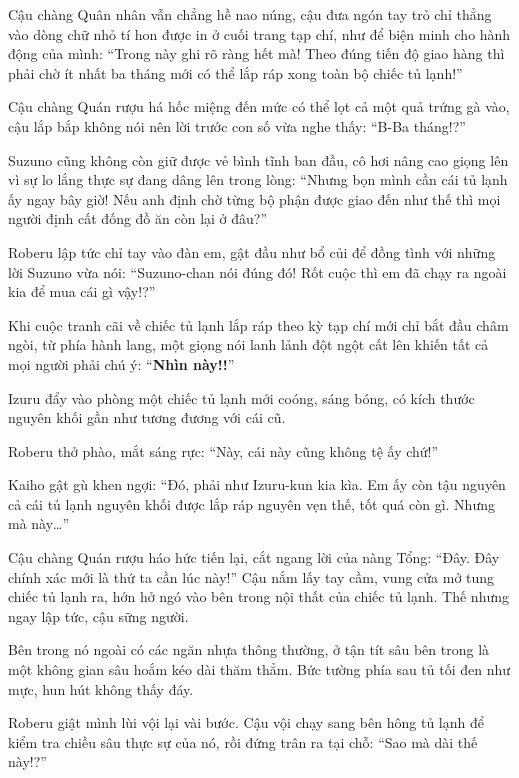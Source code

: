 \documentclass[../main.tex]{subfiles}
\begin{document}
Cậu chàng Quân nhân vẫn chẳng hề nao núng, cậu đưa ngón tay trỏ chỉ thẳng vào dòng chữ nhỏ tí hon được in ở cuối trang tạp chí, như để biện minh cho hành động của mình: ``Trong này ghi rõ ràng hết mà! Theo đúng tiến độ giao hàng thì phải chờ ít nhất ba tháng mới có thể lắp ráp xong toàn bộ chiếc tủ lạnh!''

Cậu chàng Quán rượu há hốc miệng đến mức có thể lọt cả một quả trứng gà vào, cậu lắp bắp không nói nên lời trước con số vừa nghe thấy: ``B-Ba tháng!?''

Suzuno cũng không còn giữ được vẻ bình tĩnh ban đầu, cô hơi nâng cao giọng lên vì sự lo lắng thực sự đang dâng lên trong lòng: ``Nhưng bọn mình cần cái tủ lạnh ấy ngay bây giờ! Nếu anh định chờ từng bộ phận được giao đến như thế thì mọi người định cất đống đồ ăn còn lại ở đâu?''

Roberu lập tức chỉ tay vào đàn em, gật đầu như bổ củi để đồng tình với những lời Suzuno vừa nói: ``Suzuno-chan nói đúng đó! Rốt cuộc thì em đã chạy ra ngoài kia để mua cái gì vậy!?''

Khi cuộc tranh cãi về chiếc tủ lạnh lắp ráp theo kỳ tạp chí mới chỉ bắt đầu châm ngòi, từ phía hành lang, một giọng nói lanh lảnh đột ngột cất lên khiến tất cả mọi người phải chú ý: ``\textbf{Nhìn này!!}''

Izuru đẩy vào phòng một chiếc tủ lạnh mới coóng, sáng bóng, có kích thước nguyên khối gần như tương đương với cái cũ.


Roberu thở phào, mắt sáng rực: ``Này, cái này cũng không tệ ấy chứ!''

Kaiho gật gù khen ngợi: ``Đó, phải như Izuru-kun kia kìa. Em ấy còn tậu nguyên cả cái tủ lạnh nguyên khối được lắp ráp nguyên vẹn thế, tốt quá còn gì. Nhưng mà này\dots''

Cậu chàng Quán rượu háo hức tiến lại, cắt ngang lời của nàng Tổng: ``Đây. Đây chính xác mới là thứ ta cần lúc này!'' Cậu nắm lấy tay cầm, vung cửa mở tung chiếc tủ lạnh ra, hớn hở ngó vào bên trong nội thất của chiếc tủ lạnh. Thế nhưng ngay lập tức, cậu sững người.

Bên trong nó ngoài có các ngăn nhựa thông thường, ở tận tít sâu bên trong là một không gian sâu hoắm kéo dài thăm thẳm. Bức tường phía sau tủ tối đen như mực, hun hút không thấy đáy.


Roberu giật mình lùi vội lại vài bước. Cậu vội chạy sang bên hông tủ lạnh để kiểm tra chiều sâu thực sự của nó, rồi đứng trân ra tại chỗ: ``Sao mà dài thế này!?''
\end{document}
